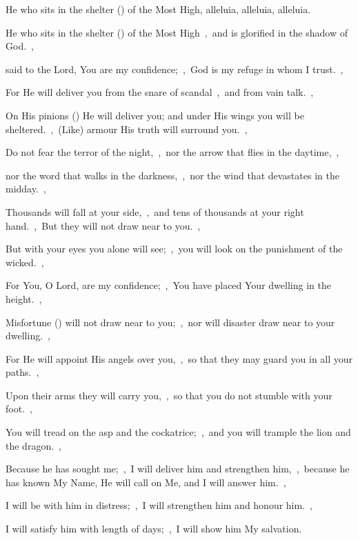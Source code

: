 \documentclass[12pt,twoside,a5paper]{article}
\begin{document}

\begin{halfparskip}
  He who sits in the shelter () of the Most High, alleluia, alleluia, alleluia.

  He who sits in the shelter () of the Most High~\sep\ and is glorified in the shadow of God.~\sep

  said to the Lord, You are my confidence;~\sep\ God is my refuge in whom I trust.~\sep

  For He will deliver you from the snare of scandal~\sep\ and from vain talk.~\sep

  On His pinions () He will deliver you; and under His wings you will be sheltered.~\sep\ (Like) armour His truth will surround you.~\sep

  Do not fear the terror of the night,~\sep\ nor the arrow that flies in the daytime,~\sep

  nor the word that walks in the darkness,~\sep\ nor the wind that devastates in the midday.~\sep

  Thousands will fall at your side,~\sep\ and tens of thousands at your right hand.~\sep\ But they will not draw near to you.~\sep

  But with your eyes you alone will see;~\sep\ you will look on the punishment of the wicked.~\sep

  For You, O Lord, are my confidence;~\sep\ You have placed Your dwelling in the height.~\sep

  Misfortune () will not draw near to you;~\sep\ nor will disaster draw near to your dwelling.~\sep

  For He will appoint His angels over you,~\sep\ so that they may guard you in all your paths.~\sep

  Upon their arms they will carry you,~\sep\ so that you do not stumble with your foot.~\sep

  You will tread on the asp and the cockatrice;~\sep\ and you will trample the lion and the dragon.~\sep

  Because he has sought me;~\sep\ I will deliver him and strengthen him,~\sep\ because he has known My Name, He will call on Me, and I will answer him.~\sep

  I will be with him in distress;~\sep\ I will strengthen him and honour him.~\sep

  I will satisfy him with length of days;~\sep\ I will show him My salvation.
\end{halfparskip}
\end{document}
